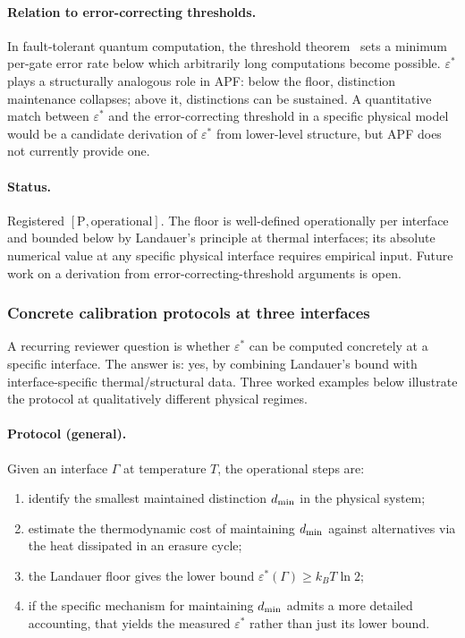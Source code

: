 \documentclass[11pt]{article}
\theoremstyle{plain}
\theoremstyle{definition}
\theoremstyle{remark}
\begin{document}
\paragraph{Relation to error-correcting thresholds.}  In fault-tolerant quantum computation, the threshold theorem~\cite{AharonovBenOr2008} sets a minimum per-gate error rate below which arbitrarily long computations become possible.  $\varepsilon^*$ plays a structurally analogous role in APF: below the floor, distinction maintenance collapses; above it, distinctions can be sustained.  A quantitative match between $\varepsilon^*$ and the error-correcting threshold in a specific physical model would be a candidate derivation of $\varepsilon^*$ from lower-level structure, but APF does not currently provide one.

\paragraph{Status.}  Registered $[\text{P}, \text{operational}]$.  The floor is well-defined operationally per interface and bounded below by Landauer's principle at thermal interfaces; its absolute numerical value at any specific physical interface requires empirical input.  Future work on a derivation from error-correcting-threshold arguments is open.

\bigskip

\subsubsection{Concrete calibration protocols at three interfaces}\label{supp:A4_protocols}

A recurring reviewer question is whether $\varepsilon^*$ can be computed concretely at a specific interface.  The answer is: yes, by combining Landauer's bound with interface-specific thermal/structural data.  Three worked examples below illustrate the protocol at qualitatively different physical regimes.

\paragraph{Protocol (general).}  Given an interface $\Gamma$ at temperature $T$, the operational steps are:
\begin{enumerate}[leftmargin=2.5em,label=\textup{(\arabic*)},itemsep=3pt]
  \item identify the smallest maintained distinction $d_{\rm min}$ in the physical system;
  \item estimate the thermodynamic cost of maintaining $d_{\rm min}$ against alternatives via the heat dissipated in an erasure cycle;
  \item the Landauer floor gives the lower bound $\varepsilon^*(\Gamma) \geq k_B T \ln 2$;
  \item if the specific mechanism for maintaining $d_{\rm min}$ admits a more detailed accounting, that yields the measured $\varepsilon^*$ rather than just its lower bound.
\end{enumerate}
\end{document}
